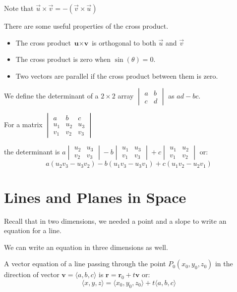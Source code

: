 \documentclass[../calc3.tex]{subfiles}
\begin{document}
Note that $\vec{u}\times\vec{v}=-(\vec{v}\times\vec{u})$

There are some useful properties of the cross product.
\begin{itemize}
    \item The cross product $\textbf{u}\times\textbf{v}$ is orthogonal to both $\vec{u}$ and $\vec{v}$
    \item The cross product is zero when $\sin(\theta)=0$.
    \item Two vectors are parallel if the cross product between them is zero.
\end{itemize}

We define the determinant of a $2\times 2$ array
$\begin{vmatrix}
a & b\\
c & d   
\end{vmatrix}$
as $ad-bc$.

For a matrix $\begin{vmatrix}
a & b & c\\
u_1 & u_2 & u_3\\
v_1 & v_2 & v_3
\end{vmatrix}$

the determinant is $a\begin{vmatrix}
    u_2 & u_3\\
    v_2 & v_3
\end{vmatrix}-b\begin{vmatrix}
    u_1 & u_3\\
    v_1 & v_3
\end{vmatrix}
+c\begin{vmatrix}
    u_1 & u_2\\
    v_1 & v_2
\end{vmatrix}$ 
or:
\[a(u_2v_3-u_3v_2)-b(u_1v_3-u_3v_1)+c(u_1v_2-u_2v_1)\]

\section{Lines and Planes in Space}
Recall that in two dimensions, we needed a point and a slope to write an equation for a line.

We can write an equation in three dimensions as well.

A vector equation of a line passing through the point $P_0(x_0,y_0,z_0)$ in the direction of vector 
$\textbf{v}=\langle a,b,c \rangle$ is $\textbf{r}=\textbf{r}_0+t\textbf{v}$ or:
\[\langle x,y,z \rangle = \langle x_0,y_0,z_0 \rangle + t\langle a,b,c \rangle\]
\end{document}
